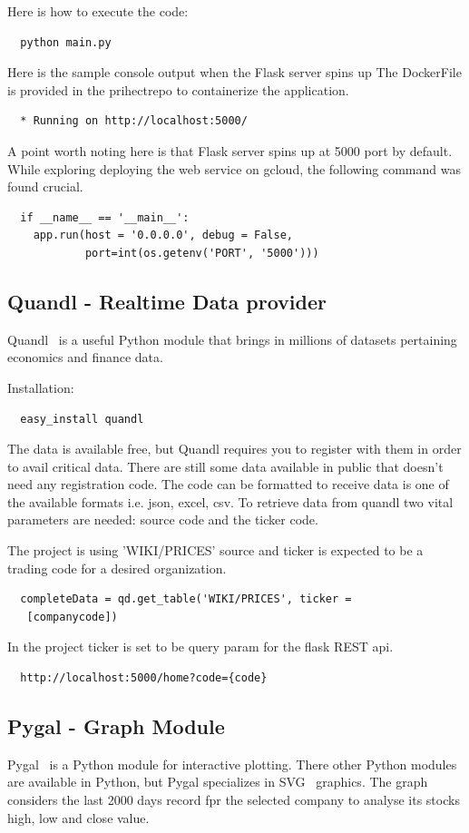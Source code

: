 Here is how to execute the code:
\begin{verbatim}
  python main.py
\end{verbatim}

Here is the sample console output when the Flask server spins up The
DockerFile is provided in the prihectrepo to containerize the application. 
\begin{verbatim}
  * Running on http://localhost:5000/
\end{verbatim}
A point worth noting here is that Flask server spins up at 5000 port by
default. While exploring deploying the web service on gcloud, the following
command was found crucial.

\begin{verbatim}
  if __name__ == '__main__':
    app.run(host = '0.0.0.0', debug = False, 
            port=int(os.getenv('PORT', '5000')))
\end{verbatim}

\subsection{Quandl - Realtime Data provider}
Quandl~\cite{hid-sp18-417-Quandl} is a useful Python module that brings in
millions of datasets pertaining economics and finance data. 

Installation:

\begin{verbatim}
  easy_install quandl
\end{verbatim}
The data is available free, but Quandl requires you to register with them in
order to avail critical data. There are still some data available in public
that doesn’t need any registration code. The code can be formatted to receive
data is one of the available formats i.e. json, excel, csv. To retrieve data
from quandl two vital parameters are needed: source code and the ticker code.

The project is using 'WIKI/PRICES' source and ticker is expected to be a
trading code for a desired organization.
\begin{verbatim}
  completeData = qd.get_table('WIKI/PRICES', ticker =
   [companycode])
\end{verbatim}

In the project ticker is set to be query param for the flask REST api.
\begin{verbatim}
  http://localhost:5000/home?code={code}
\end{verbatim}
\subsection{Pygal - Graph Module}
Pygal~\cite{hid-sp18-417-Pygal} is a Python module for interactive plotting.
There other Python modules are available in Python, but Pygal specializes in
SVG~\cite{hid-sp18-417-SVG} graphics. The graph considers the last 2000 days
record fpr the selected company to analyse its stocks high, low and close
value.

